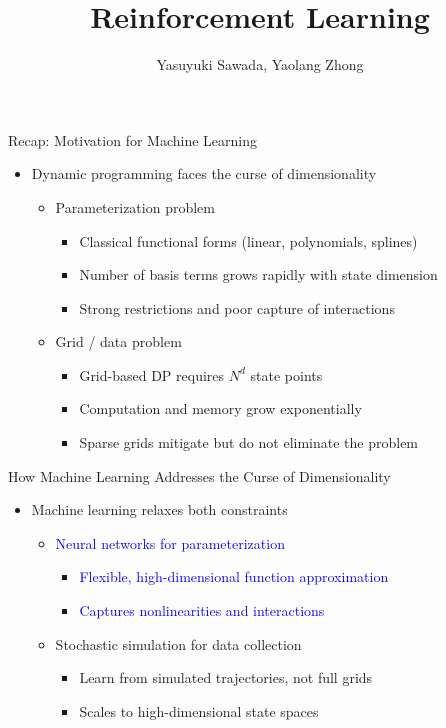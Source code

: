 \documentclass[aspectratio=169]{beamer}
\title{Reinforcement Learning}
\author{Yasuyuki Sawada, Yaolang Zhong}
\institute{University of Tokyo\\
  \small \texttt{\href{mailto:yaolang.zhong@e.u-tokyo.ac.jp}{yaolang.zhong@e.u-tokyo.ac.jp}}}
\date{}
\newcommand{\1}{\mathbf{1}}
\begin{document}
\begin{frame}
\titlepage  
\end{frame}



\begin{frame}{Recap: Motivation for Machine Learning}
  \begin{itemize}
      \item Dynamic programming faces the curse of dimensionality
      \begin{itemize}
          \item Parameterization problem
          \begin{itemize}
              \item Classical functional forms (linear, polynomials, splines)
              \item Number of basis terms grows rapidly with state dimension
              \item Strong restrictions and poor capture of interactions
          \end{itemize}
          \item Grid / data problem
          \begin{itemize}
              \item Grid-based DP requires $N^d$ state points
              \item Computation and memory grow exponentially
              \item Sparse grids mitigate but do not eliminate the problem
          \end{itemize}
      \end{itemize}
  \end{itemize}
  \end{frame}

  \begin{frame}{How Machine Learning Addresses the Curse of Dimensionality}
    \begin{itemize}
        \item Machine learning relaxes both constraints
        \begin{itemize}
            \item \textcolor{blue}{Neural networks for parameterization}
            \begin{itemize}
                \item \textcolor{blue}{Flexible, high-dimensional function approximation}
                \item \textcolor{blue}{Captures nonlinearities and interactions}
            \end{itemize}
            \item Stochastic simulation for data collection
            \begin{itemize}
                \item Learn from simulated trajectories, not full grids
                \item Scales to high-dimensional state spaces
            \end{itemize}
        \end{itemize}
    \end{itemize}
    \end{frame}
\end{document}
